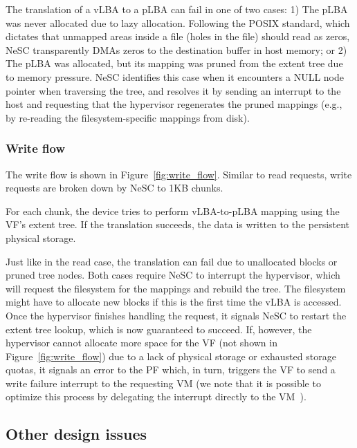 The translation of a vLBA to a pLBA can fail in one of two cases:
  1) The pLBA was never allocated due to lazy allocation. Following the POSIX standard, which dictates that unmapped areas inside a file (holes in the file) should read as zeros, NeSC transparently DMAs zeros to the destination buffer in host memory; or
  2) The pLBA was allocated, but its mapping was pruned from the extent tree due to memory pressure. NeSC identifies this case when it encounters a NULL node pointer when traversing the tree, and resolves it by sending an interrupt to the host and requesting that the hypervisor regenerates the pruned mappings (e.g., by re-reading the filesystem-specific mappings from disk).

\subsubsection*{Write flow}

The write flow is shown in Figure~\ref{fig:write_flow}. Similar to read requests, write requests are broken down by NeSC to 1KB chunks.

For each chunk, the device tries to perform vLBA-to-pLBA mapping using the VF's extent tree. If the translation succeeds, the data is written to the persistent physical storage.

  Just like in the read case, the translation can fail due to unallocated blocks or pruned tree nodes. Both cases require NeSC to interrupt the hypervisor, which will request the filesystem for the mappings and rebuild the tree. The filesystem might have to allocate new blocks if this is the first time the vLBA is accessed. Once the hypervisor finishes handling the request, it signals NeSC to restart the extent tree lookup, which is now guaranteed to succeed.
%
 If, however, the hypervisor cannot allocate more space for the VF (not shown in Figure~\ref{fig:write_flow}) due to a lack of physical storage or exhausted storage quotas, it signals an error to the PF which, in turn, triggers the VF to send a write failure interrupt to the requesting VM (we note that it is possible to optimize this process by delegating the interrupt directly to the VM~\cite{gordon12eli}).

\subsection{Other design issues}

